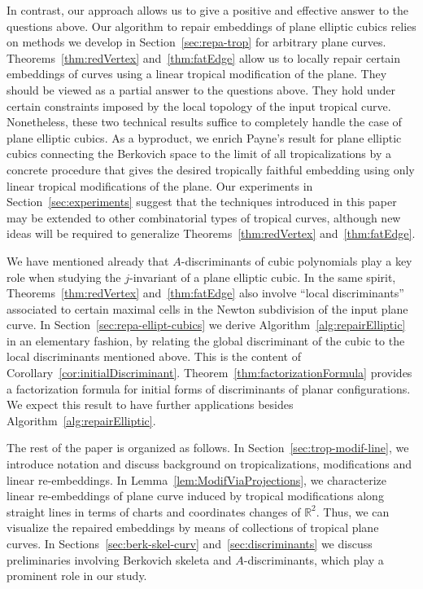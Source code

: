 \documentclass[11pt]{amsart}
\numberwithin{equation}{section}
\theoremstyle{plain}
\theoremstyle{definition}
\theoremstyle{remark}
\begin{document}
In contrast, our approach allows us to give a positive and effective
answer to the questions above.  Our algorithm to repair embeddings of
plane elliptic cubics relies on methods we develop in
Section~\ref{sec:repa-trop} for arbitrary plane
curves. Theorems~\ref{thm:redVertex} and~\ref{thm:fatEdge} allow us to
locally repair certain embeddings of curves using a linear tropical
modification of the plane.  They should be viewed as a partial answer
to the questions above. They hold under certain constraints imposed by
the local topology of the input tropical curve.  Nonetheless, these
two technical results suffice to completely handle the case of plane
elliptic cubics.  As a byproduct, we enrich Payne's result
\cite[Theorem 4.2]{Pay09} for plane elliptic cubics connecting the
Berkovich space to the limit of all tropicalizations by a concrete
procedure that gives the desired tropically faithful embedding using
only linear tropical modifications of the plane.  Our experiments in
Section~\ref{sec:experiments} suggest that the techniques introduced
in this paper may be extended to other combinatorial types of tropical
curves, although new ideas will be required to generalize
Theorems~\ref{thm:redVertex} and~\ref{thm:fatEdge}.

We have mentioned already that $A$-discriminants of cubic polynomials
play a key role when studying the $j$-invariant of a plane elliptic
cubic. In the same spirit, Theorems~\ref{thm:redVertex} and~\ref{thm:fatEdge} also involve
``local discriminants'' associated to certain maximal cells in the
Newton subdivision of the input plane
curve. In Section~\ref{sec:repa-ellipt-cubics} we derive
Algorithm~\ref{alg:repairElliptic} in an elementary fashion, by relating the global discriminant of the cubic to the local
discriminants mentioned above. This is the content of
Corollary~\ref{cor:initialDiscriminant}. Theorem~\ref{thm:factorizationFormula}  provides a factorization
formula for initial forms of discriminants of planar configurations. We expect this result to
have further applications besides Algorithm~\ref{alg:repairElliptic}.

\smallskip

The rest of the paper is organized as follows. In
Section~\ref{sec:trop-modif-line}, we introduce notation and discuss
background on tropicalizations, modifications and linear
re-embeddings.  In Lemma~\ref{lem:ModifViaProjections}, we
characterize linear re-embeddings of plane curve induced by tropical
modifications along straight lines in terms of charts and coordinates
changes of ${\mathbb{R}}^2$.  Thus, we can visualize the repaired embeddings by
means of collections of tropical plane curves. In
Sections~\ref{sec:berk-skel-curv} and~\ref{sec:discriminants} we
discuss preliminaries involving Berkovich skeleta and
$A$-discriminants, which play a prominent role in our study.
\end{document}
